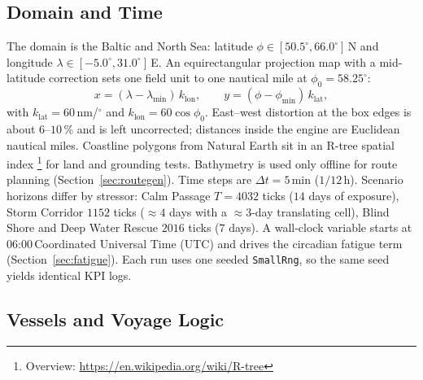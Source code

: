 \documentclass[cameraready]{Interspeech}
\newcommand{\wikifn}[1]{%
  \footnote{Overview: \url{https://en.wikipedia.org/wiki/#1}}%
}
\begin{document}
\subsection{Domain and Time}

The domain is the Baltic and North Sea: latitude $\phi \in [50.5^\circ, 66.0^\circ]$\,N and longitude $\lambda \in [-5.0^\circ, 31.0^\circ]$\,E. An equirectangular projection map with a mid-latitude correction sets one field unit to one nautical mile at $\phi_0 = 58.25^\circ$:
\begin{equation*}
  x = (\lambda - \lambda_{\min})\,k_{\text{lon}}, \qquad
  y = (\phi - \phi_{\min})\,k_{\text{lat}},
\end{equation*}
with $k_{\text{lat}} = 60$\,nm/$^\circ$ and $k_{\text{lon}} = 60\cos\phi_0$. East--west distortion at the box edges is about $6$--$10\,\%$ and is left uncorrected; distances inside the engine are Euclidean nautical miles. Coastline polygons from Natural Earth sit in an R-tree spatial index\wikifn{R-tree} for land and grounding tests. Bathymetry is used only offline for route planning (Section~\ref{sec:routegen}). Time steps are $\Delta t = 5$\,min ($1/12$\,h). Scenario horizons differ by stressor: Calm Passage $T = 4032$ ticks ($14$ days of exposure), Storm Corridor $1152$ ticks (${\approx}4$ days with a ${\approx}3$-day translating cell), Blind Shore and Deep Water Rescue $2016$ ticks ($7$ days). A wall-clock variable starts at 06:00\,Coordinated Universal Time (UTC) and drives the circadian fatigue term (Section~\ref{sec:fatigue}). Each run uses one seeded \texttt{SmallRng}, so the same seed yields identical KPI logs.

\subsection{Vessels and Voyage Logic}
\end{document}

